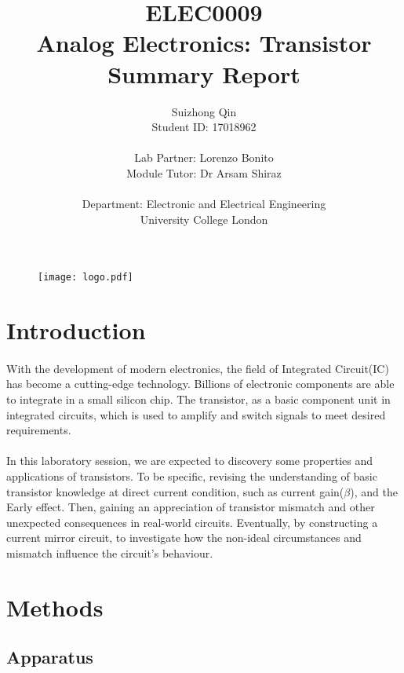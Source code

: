 \documentclass[12pt]{article}
\title{ELEC0009 \\Analog Electronics: Transistor \\Summary Report}
\author{Suizhong Qin \\Student ID: 17018962 \\ \\Lab Partner: Lorenzo Bonito\\Module Tutor: Dr  Arsam Shiraz \\ \\ Department: Electronic and Electrical Engineering \\ University College London}
\begin{document}
    \begin{figure}[t] %
    \centering
    \texttt{[image: logo.pdf]}
    \end{figure}
    \maketitle
    \thispagestyle{empty}

    \newpage
    \tableofcontents
    \thispagestyle{empty}
    \setcounter{page}{0}
    
    \newpage
    \pagestyle{plain}
    \section{Introduction}
    \paragraph{}
    With the development of modern electronics, the field of Integrated Circuit(IC) has become a cutting-edge technology. Billions of electronic components are able to integrate in a small silicon chip\cite{1}. The transistor, as a basic component unit in integrated circuits, which is used to amplify and switch signals to meet desired requirements.
    \paragraph{}
    In this laboratory session, we are expected to discovery some properties and applications of transistors. To be specific, revising the understanding of basic transistor knowledge at direct current condition, such as current gain($\beta$), and the Early effect. Then, gaining an appreciation of transistor mismatch and other unexpected consequences in real-world circuits. Eventually, by constructing a current mirror circuit, to investigate how the non-ideal circumstances and mismatch influence the circuit's behaviour. 
    
    \section{Methods}
    \subsection{Apparatus}
\end{document}
